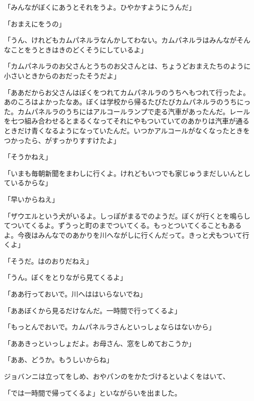 「みんながぼくにあうとそれをうよ。ひやかすようにうんだ」

「おまえにをうの」

「うん、けれどもカムパネルラなんかしてわない。カムパネルラはみんながそんなことをうときはきのどくそうにしているよ」

「カムパネルラのお父さんとうちのお父さんとは、ちょうどおまえたちのように小さいときからのおだったそうだよ」

「ああだからお父さんはぼくをつれてカムパネルラのうちへもつれて行ったよ。あのころはよかったなあ。ぼくは学校から帰るたびたびカムパネルラのうちにった。カムパネルラのうちにはアルコールランプで走る汽車があったんだ。レールを七つ組み合わせるとまるくなってそれにやもついていてのあかりは汽車が通るときだけ青くなるようになっていたんだ。いつかアルコールがなくなったときをつかったら、がすっかりすすけたよ」

「そうかねえ」

「いまも毎朝新聞をまわしに行くよ。けれどもいつでも家じゅうまだしいんとしているからな」

「早いからねえ」

「ザウエルという犬がいるよ。しっぽがまるでのようだ。ぼくが行くとを鳴らしてついてくるよ。ずうっと町のまでついてくる。もっとついてくることもあるよ。今夜はみんなでのあかりを川へながしに行くんだって。きっと犬もついて行くよ」

「そうだ。はのおりだねえ」

「うん。ぼくをとりながら見てくるよ」

「ああ行っておいで。川へははいらないでね」

「ああぼくから見るだけなんだ。一時間で行ってくるよ」

「もっとんでおいで。カムパネルラさんといっしょならはないから」

「ああきっといっしょだよ。お母さん、窓をしめておこうか」

「ああ、どうか。もうしいからね」

ジョバンニは立ってをしめ、おやパンのをかたづけるといよくをはいて、

「では一時間で帰ってくるよ」といながらいを出ました。

